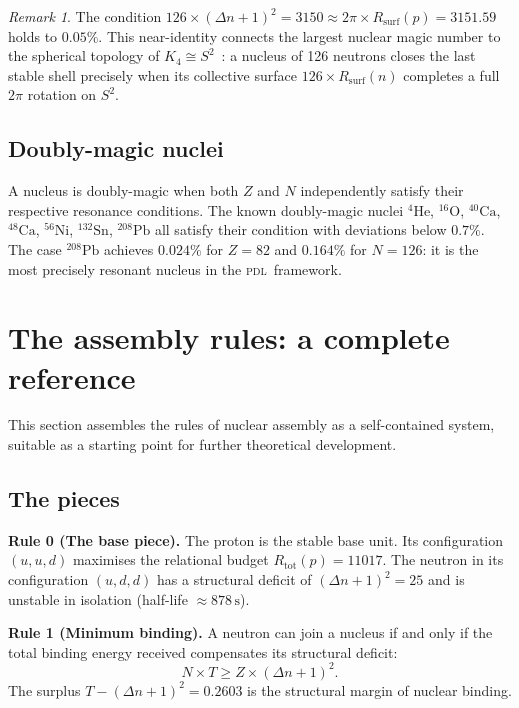 \documentclass{article}
\theoremstyle{remark}
\newtheorem{remark}[theorem]{Remark}
\newcommand{\PDL}{\textsc{pdl}}
\newcommand{\Rsurf}{R_{\mathrm{surf}}}
\newcommand{\Rtot}{R_{\mathrm{tot}}}
\newcommand{\Deltanop}{\Delta n}
\begin{document}
\begin{remark}
The condition $126 \times (\Deltanop+1)^2 = 3150 \approx 2\pi \times \Rsurf(p) = 3151.59$ holds to $0.05\%$. This near-identity connects the largest nuclear magic number to the spherical topology of $K_4 \cong S^2$~\cite{D23}: a nucleus of 126 neutrons closes the last stable shell precisely when its collective surface $126 \times \Rsurf(n)$ completes a full $2\pi$ rotation on $S^2$.
\end{remark}

\subsection{Doubly-magic nuclei}

A nucleus is doubly-magic when both $Z$ and $N$ independently satisfy their respective resonance conditions. The known doubly-magic nuclei ${}^4\mathrm{He}$, ${}^{16}\mathrm{O}$, ${}^{40}\mathrm{Ca}$, ${}^{48}\mathrm{Ca}$, ${}^{56}\mathrm{Ni}$, ${}^{132}\mathrm{Sn}$, ${}^{208}\mathrm{Pb}$ all satisfy their condition with deviations below $0.7\%$. The case ${}^{208}\mathrm{Pb}$ achieves $0.024\%$ for $Z = 82$ and $0.164\%$ for $N = 126$: it is the most precisely resonant nucleus in the \PDL\ framework.

\section{The assembly rules: a complete reference}
\label{sec:rules}

This section assembles the rules of nuclear assembly as a self-contained system, suitable as a starting point for further theoretical development.

\subsection{The pieces}

\textbf{Rule 0 (The base piece).} The proton is the stable base unit. Its configuration $(u,u,d)$ maximises the relational budget $\Rtot(p) = 11017$. The neutron in its configuration $(u,d,d)$ has a structural deficit of $(\Deltanop+1)^2 = 25$ and is unstable in isolation (half-life $\approx 878\,\mathrm{s}$).

\textbf{Rule 1 (Minimum binding).} A neutron can join a nucleus if and only if the total binding energy received compensates its structural deficit:
\begin{equation}
  N \times T \geq Z \times (\Deltanop+1)^2.
  \label{eq:rule1}
\end{equation}
The surplus $T - (\Deltanop+1)^2 = 0.2603$ is the structural margin of nuclear binding.
\end{document}
